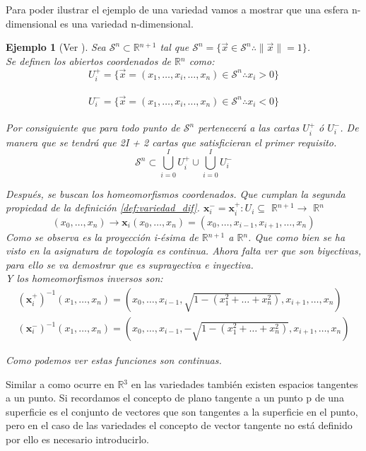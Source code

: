 \documentclass[pdftex,11pt,a4paper]{book}
\newtheorem{ejem}{Ejemplo}
\newcommand{\s}{\mathcal{S}}
\newcommand{\R}{$\mathbb{R}$}
\begin{document}
Para poder ilustrar el ejemplo de una variedad vamos a mostrar que una esfera n-dimensional es una variedad n-dimensional.
\begin{ejem}[Ver \cite{Fomenko}] 
Sea $\mathcal{S}^n \subset $\R$^{n+1} $ tal que $\mathcal{S}^n = \lbrace \vec{x} \in \mathcal{S}^n \therefore \|\vec{x}\| = 1\rbrace  $.\\
Se definen los abiertos coordenados de \R$^n$ como:\\
$$ U^+_i = \lbrace \vec{x} =  (x_1,\dots, x_i, \dots , x_n) \in \s^n \therefore x_i > 0 \rbrace $$\\
$$ U^-_i = \lbrace \vec{x} =  (x_1, \dots, x_i, ... , x_n) \in \s^n \therefore x_i < 0 \rbrace $$\\
Por consiguiente que para todo punto de $\s^n$ pertenecerá a las cartas $ U^+_i $ ó $U^-_i$. De manera que se tendrá que 2I + 2 cartas que satisficieran el primer requisito. 
$$ \s^n \subset \bigcup_{i = 0}^I U^+_i \cup \bigcup_{i = 0}^I U^-_i  $$

Después, se buscan los homeomorfismos coordenados. Que cumplan la segunda propiedad de la definición \ref{def:variedad_dif}.
$ \textbf{x}_i^{-} = \textbf{x}_i^{+} : U_i \subseteq$ \R$^{n+1} \rightarrow$ \R$^n$
$$ (x_0,\dots, x_n) \rightarrow \textbf{x}_i (x_0,\dots, x_n) = (x_0,\dots,x_{i-1}, x_{i+1}, \dots, x_n)$$
Como se  observa es la proyección i-ésima de \R$^{n+1}$ a \R$^n$. Que como bien se ha visto en la asignatura de topología es continua. Ahora falta ver que son biyectivas, para ello se va demostrar que es suprayectiva e inyectiva.\\

Y los homeomorfismos inversos son:\\
\begin{equation}
    \begin{aligned}
        (\textbf{x}_i^+)^{-1} (x_1,\dots, x_n) = (x_0,\dots,x_{i-1},\sqrt{1-(x_1^2+\dots +x_n^2)} , x_{i+1}, \dots, x_n) \\
(\textbf{x}_i^-)^{-1} (x_1,\dots, x_n) = (x_0,\dots,x_{i-1},-\sqrt{1-(x_1^2+\dots+ x_n^2)} , x_{i+1}, \dots, x_n)   
    \end{aligned}
\end{equation}

Como podemos ver estas funciones son continuas. 

\end{ejem}

Similar a como ocurre en \R$^3$ en las variedades también existen espacios tangentes a un punto.
Si recordamos el concepto de plano tangente a un punto p de una superficie es el conjunto de vectores que son tangentes a la superficie en el punto, pero en el caso de las variedades el concepto de vector tangente no está definido por ello es necesario introducirlo. 
\end{document}
